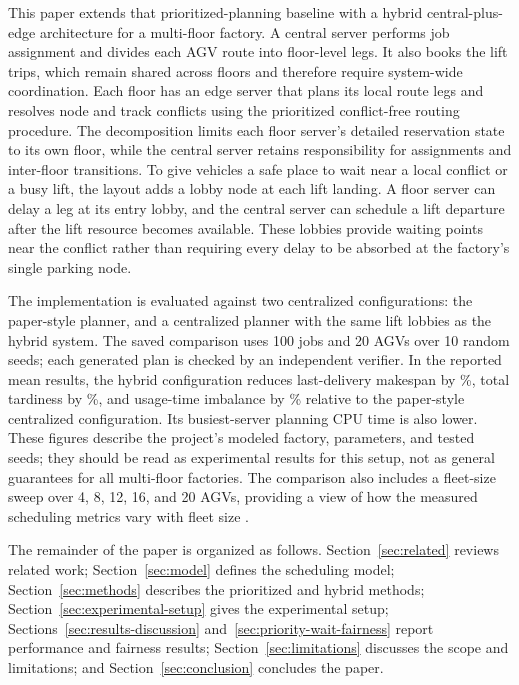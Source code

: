 This paper extends that prioritized-planning baseline with a hybrid
central-plus-edge architecture for a multi-floor factory. A central server
performs job assignment and divides each AGV route into floor-level legs. It
also books the lift trips, which remain shared across floors and therefore
require system-wide coordination. Each floor has an edge server that plans
its local route legs and resolves node and track conflicts using the
prioritized conflict-free routing procedure. The decomposition limits each
floor server's detailed reservation state to its own floor, while the central
server retains responsibility for assignments and inter-floor transitions.
To give vehicles a safe place to wait near a local conflict or a busy lift,
the layout adds a lobby node at each lift landing. A floor server can delay a
leg at its entry lobby, and the central server can schedule a lift departure
after the lift resource becomes available. These lobbies provide waiting
points near the conflict rather than requiring every delay to be absorbed at
the factory's single parking node.

The implementation is evaluated against two centralized configurations: the
paper-style planner, and a centralized planner with the same lift lobbies as
the hybrid system. The saved comparison uses 100 jobs and 20 AGVs over 10
random seeds; each generated plan is checked by an independent verifier. In
the reported mean results, the hybrid configuration reduces last-delivery
makespan by \RedMakespanCAabs\%, total tardiness by \RedTardinessCAabs\%,
and usage-time imbalance by \RedImbalanceCAabs\%
relative to the paper-style centralized configuration. Its busiest-server
planning CPU time is also lower. These figures describe the project's
modeled factory, parameters, and tested seeds; they should be read as
experimental results for this setup, not as general guarantees for all
multi-floor factories. The comparison also includes a fleet-size sweep over
4, 8, 12, 16, and 20 AGVs, providing a view of how the measured scheduling
metrics vary with fleet size \cite{projectRepo}.

The remainder of the paper is organized as follows. Section~\ref{sec:related}
reviews related work; Section~\ref{sec:model} defines the scheduling model;
Section~\ref{sec:methods} describes the prioritized and hybrid methods;
Section~\ref{sec:experimental-setup} gives the experimental setup;
Sections~\ref{sec:results-discussion} and~\ref{sec:priority-wait-fairness}
report performance and fairness results; Section~\ref{sec:limitations}
discusses the scope and limitations; and Section~\ref{sec:conclusion}
concludes the paper.

